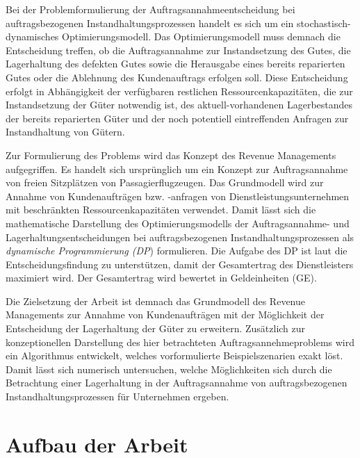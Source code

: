 Bei der Problemformulierung der Auftragsannahmeentscheidung bei auftragsbezogenen Instandhaltungsprozessen handelt es sich um ein stochastisch-dynamisches Optimierungsmodell. Das Optimierungsmodell muss demnach die Entscheidung treffen, ob die Auftragsannahme zur Instandsetzung des Gutes, die Lagerhaltung des defekten Gutes sowie die Herausgabe eines bereits reparierten Gutes oder die Ablehnung des Kundenauftrags erfolgen soll. Diese Entscheidung erfolgt in Abhängigkeit der verfügbaren restlichen Ressourcenkapazitäten, die zur Instandsetzung der Güter notwendig ist, des aktuell-vorhandenen Lagerbestandes der bereits reparierten Güter und der noch potentiell eintreffenden Anfragen zur Instandhaltung von Gütern.

Zur Formulierung des Problems wird das Konzept des Revenue Managements aufgegriffen. Es handelt sich ursprünglich um ein Konzept zur Auftragsannahme von freien Sitzplätzen von Passagierflugzeugen. Das Grundmodell wird zur Annahme von Kundenaufträgen bzw. -anfragen von Dienstleistungsunternehmen mit beschränkten Ressourcenkapazitäten verwendet. %
Damit lässt sich die mathematische Darstellung des Optimierungsmodells der Auftragsannahme- und Lagerhaltungsentscheidungen bei auftragsbezogenen Instandhaltungsprozessen als \textit{dynamische Programmierung (DP}) formulieren.
Die Aufgabe des DP ist laut \cite{talluri2004theory} die Entscheidungsfindung zu unterstützen, damit der Gesamtertrag des Dienstleisters maximiert wird. Der Gesamtertrag wird bewertet in Geldeinheiten (GE). 


Die Zielsetzung der Arbeit ist demnach das Grundmodell des Revenue Managements zur Annahme von Kundenaufträgen mit der Möglichkeit der Entscheidung der Lagerhaltung der Güter zu erweitern. Zusätzlich zur konzeptionellen Darstellung des hier betrachteten Auftragsannehmeproblems wird ein Algorithmus entwickelt, welches vorformulierte Beispielszenarien exakt löst.  Damit lässt sich numerisch untersuchen, welche Möglichkeiten sich durch die Betrachtung einer Lagerhaltung in der Auftragsannahme von auftragsbezogenen Instandhaltungsprozessen für Unternehmen ergeben.

\section{Aufbau der Arbeit}

